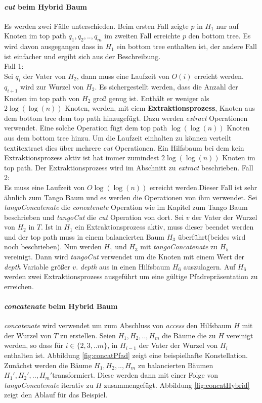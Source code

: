 \documentclass[a4paper,12pt]{article}
\begin{document}
\paragraph{\textit{cut} beim Hybrid Baum}
Es werden zwei Fälle unterschieden. Beim ersten Fall zeigte $p$ in $H_1$ nur auf Knoten im top path $q_1,q_2,..,q_m$ im zweiten Fall erreichte $p$ den bottom tree. Es wird davon ausgegangen dass in $H_1$ ein bottom tree enthalten ist, der andere Fall ist einfacher und ergibt sich aus der Beschreibung.\\
Fall 1:\\
Sei $q_i$ der Vater von $H_2$, dann muss eine Laufzeit von $O\left(i\right)$ erreicht werden. $q_{i+1}$ wird zur Wurzel von $H_2$. Es sichergestellt werden, dass die Anzahl der Knoten im top path von $H_2$ groß genug ist. Enthält er weniger als $2 \log\left(\log\left(n\right)\right)$ Knoten, werden, mit eiem \textbf{Extraktionsprozess}, Knoten aus dem bottom tree dem top path hinzugefügt. Dazu werden \textit{extract} Operationen verwendet. Eine solche Operation fügt dem top path $\log\left(\log\left(n\right)\right)$ Knoten aus dem bottom tree hinzu. Um die Laufzeit einhalten zu können verteilt textit{extract} dies über mehrere \textit{cut} Operationen. Ein Hilfsbaum bei dem kein Extraktionsprozess aktiv ist hat immer zumindest  $2 \log\left(\log\left(n\right)\right)$ Knoten im top path. Der Extraktionsprozess wird im Abschnitt zu \textit{extract} beschrieben.  
Fall 2:\\
Es muss eine Laufzeit von $O\log\left(\log\left(n\right)\right)$ erreicht werden.Dieser Fall ist sehr ähnlich zum Tango Baum und es werden die Operationen von ihm verwendet. Sei \textit{tangoConcatenate} die \textit{concatenate} Operation wie im Kapitel zum Tango Baum beschrieben und \textit{tangoCut} die \textit{cut} Operation von dort. Sei $v$ der Vater der Wurzel von $H_2$ in $T$. Ist in $H_1$ ein Extraktionsprozess aktiv, muss dieser beendet werden und der top path muss in einem balancierten Baum $H_3$ überführt(beides wird noch beschrieben). Nun werden $H_1$ und $H_3$ mit \textit{tangoConcatenate}  zu $H_5$ vereinigt. Dann wird \textit{tangoCut} verwendet um die Knoten mit einem Wert der \textit{depth} Variable größer $v.$ \textit{depth} aus in einen Hilfsbaum $H_6$ auszulagern. Auf $H_6$ werden zwei Extraktionsprozess ausgeführt um eine gültige Pfadrepräsentation zu erreichen.   

\paragraph{\textit{concatenate} beim Hybrid Baum}
\textit{concatenate} wird verwendet um zum Abschluss von \textit{access} den Hilfsbaum $H$ mit der Wurzel von $T$ zu erstellen. Seien $H_1,H_2,..,H_m$ die Bäume die zu $H$ vereinigt werden, so dass für $i \in \{2,3,..m\}$, in $H_{i-1}$ der Vater der Wurzel von $H_i$ enthalten ist. Abbildung \ref{fig:concatPfad} zeigt eine beispielhafte Konstellation. Zunächst werden die Bäume $H_1,H_2,..,H_m$ zu balancierten Bäumen $H_1',H_2',..,H_m'$transformiert. Diese werden dann mit einer Folge von \textit{tangoConcatenate} iterativ zu $H$ zusammengefügt. Abbildung \ref{fig:concatHybrid} zeigt den Ablauf für das Beispiel.
\end{document}

